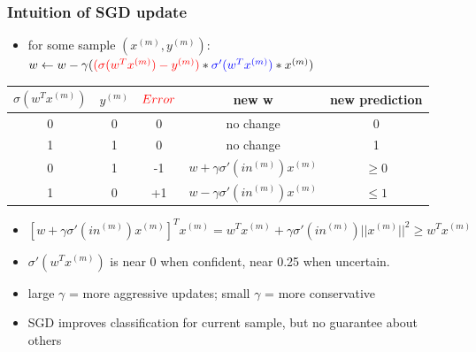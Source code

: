 \documentclass{beamer}
\newcommand{\bi}{\begin{itemize}}
\newcommand{\ei}{\end{itemize}}
\begin{document}
\begin{frame}
\frametitle{Intuition of SGD update}
\bi
\item for some sample $(x^{(m)},y^{(m)})$:\\
 \hspace{1cm} $w \leftarrow w - \gamma({\color{red} (\sigma(w^Tx^{(m)})-y^{(m)})} * {\color{blue} \sigma'(w^Tx^{(m)})} * x^{(m)} )$
\ei
\begin{center}
\begin{tabular}{|c|c|c|c|c|}
\hline
$\sigma(w^Tx^{(m)})$ & $y^{(m)}$ & ${\color{red}Error}$ & new w & new prediction \\\hline\hline
0 & 0 & 0 & no change & 0 \\\hline
1 & 1 & 0 & no change & 1 \\\hline
0 & 1 & -1 & $w + \gamma \sigma'(in^{(m)})x^{(m)}$ & $\geq0$ \\\hline
1 & 0 & +1 & $w - \gamma \sigma'(in^{(m)})x^{(m)}$ & $\leq1$ \\\hline
\end{tabular}
\end{center}
\pause
\bi
\item \begin{small} $\left[w + \gamma \sigma'(in^{(m)})x^{(m)}\right]^T x^{(m)} = w^Tx^{(m)} + \gamma \sigma'(in^{(m)})||x^{(m)}||^2  \geq w^Tx^{(m)} $ \end{small}
\pause
\item $\sigma'(w^Tx^{(m)})$ is near 0 when confident, near 0.25 when uncertain.
\pause
\item large $\gamma$ = more aggressive updates; small $\gamma$ = more conservative
\pause
\item SGD improves classification for current sample, but no guarantee about others
\ei
\end{frame}
\end{document}
